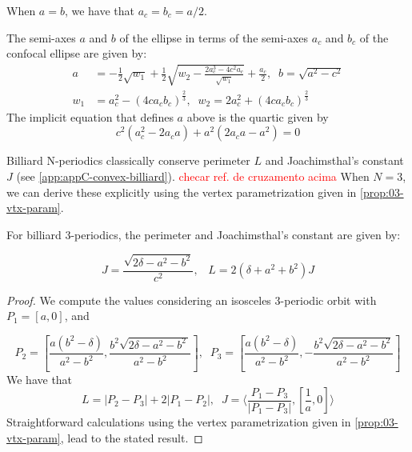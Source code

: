 When $a=b$, we have that $a_c=b_c=a/2$.

\begin{remark}
The semi-axes $a$ and $b$ of the ellipse in terms of the semi-axes $a_c$ and $b_c$ of the confocal ellipse are given by:
\begin{align*}
a&= -\frac{1}{2} \sqrt{w_1} + \frac{1}{2} \sqrt{ w_2 -\frac{ 2 a_c^3 - 4 c^2a_c}{\sqrt{w_1}} } +\frac{a_c}{2},\;\; b=\sqrt{a^2-c^2}\\
w_1&=a_c^2-(4 c a_c b_c)^{\frac{2}{3}},\;\; w_2=2 a_c^2+ (4 c a_c b_c)^{\frac{2}{3}}
\end{align*}
The implicit equation that defines $a$ above is the quartic  given by
\[c^2( a_c^2   - 2   a_c   a )+ a^2(2a_c a  - a^2)=0\]
\end{remark}

Billiard N-periodics classically conserve  perimeter $L$ and Joachimsthal's constant $J$ (see \cref{app:appC-convex-billiard}).
\textcolor{red}{checar ref. de cruzamento acima}
When $N=3$, we can derive these explicitly using the vertex parametrization given in \cref{prop:03-vtx-param}.
 

\begin{proposition}
For billiard 3-periodics, the perimeter and Joachimsthal's constant are given by:

\begin{equation*}
J=\frac{\sqrt{2\delta-a^2-b^2}}{c^2},\;\;\;L=2(\delta+a^2+b^2)J
\label{eqn:n3-L-J}
\end{equation*}
\end{proposition}

\begin{proof} We compute the values considering  an isosceles 3-periodic orbit with $P_1=[a,0]$, and

 {\small 
 \begin{equation} \label{eq:orbita3-isosceles}
 P_2=\left[   {\frac {a \left(  {b}^{2}-\delta \right) }{   a^2-b^2 
 			  }},{\frac {{b}^{2}\sqrt {2 \delta -{a}^{2}-{b}^{2}\,
 				}}{{a}^{2}-{b}^{2}}} 
 	\right], \;\; P_3=\left[  {\frac {a \left(  {b}^{2}-\delta \right) }{   a^2-b^2   
 	}},-{\frac {{b}^{2}\sqrt {2\delta-{a}^{2}-{b}^{2} 
 				}}{{a}^{2}-{b}^{2}}} 
 	\right]
 	\end{equation}
 	}
 	We have that
 	\[L=|P_2-P_3|+2|P_1-P_2|,\;\;
 	 J=\langle \frac{P_1-P_3}{|P_1-P_3|},[\frac{1}{a},0]\rangle\]
 	 Straightforward calculations using the vertex parametrization given in \cref{prop:03-vtx-param}, lead to the stated result.
\end{proof}

